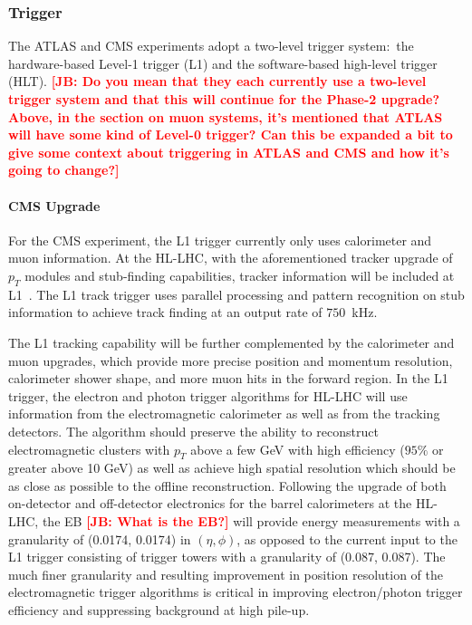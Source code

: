 \subsubsection{Trigger} \label{sec:upgradetrigger}

The ATLAS and CMS experiments adopt a two-level trigger system:~the hardware-based Level-1 trigger (L1) and the software-based high-level trigger (HLT). {\bf \textcolor{red}{[JB: Do you mean that they each currently use a two-level trigger system and that this will continue for the Phase-2 upgrade? Above, in the section on muon systems, it's mentioned that ATLAS will have some kind of Level-0 trigger?  Can this be expanded a bit to give some context about triggering in ATLAS and CMS and how it's going to change?]}}

\paragraph{CMS Upgrade}

For the CMS experiment, the L1 trigger currently only uses calorimeter and muon information. At the HL-LHC, with the aforementioned tracker upgrade of $p_T$ modules and stub-finding capabilities, tracker information will be included at L1~\cite{Lourenco:2283192}. The L1 track trigger uses parallel processing and pattern recognition on stub information to achieve track finding at an output rate of $750$~kHz. 

The L1 tracking capability will be further complemented by the calorimeter and muon upgrades, which provide more precise position and momentum resolution, calorimeter shower shape, and more muon hits in the forward region. In the L1 trigger, the electron and photon trigger algorithms for HL-LHC will use information from the electromagnetic calorimeter as well as from the tracking detectors. The algorithm should preserve the ability to reconstruct electromagnetic clusters with $p_T$ above a few GeV with high efficiency ($95\%$ or greater above 10 GeV) as well as achieve high spatial resolution which should be as close as possible to the offline reconstruction. Following the upgrade of both on-detector and off-detector electronics for the barrel calorimeters at the HL-LHC, the EB {\bf \textcolor{red}{[JB: What is the EB?]}} will provide energy measurements with a granularity of (0.0174, 0.0174)
in $(\eta, \phi)$, as opposed to the current input to the L1 trigger consisting of trigger towers with a granularity of (0.087, 0.087). The much finer granularity and resulting improvement in position resolution of the electromagnetic trigger algorithms is critical in improving electron/photon trigger efficiency and suppressing background at high pile-up.

